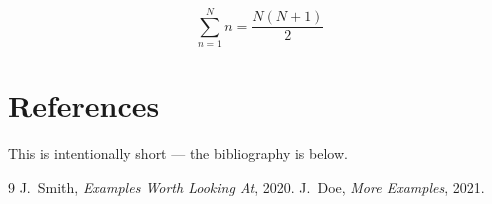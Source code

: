 \documentclass{book}
\begin{document}
\begin{equation}\label{eq:closing}
\sum_{n=1}^{N} n = \frac{N(N+1)}{2}
\end{equation}

\chapter{References}\label{ch:references}

This is intentionally short — the bibliography is below.

\begin{thebibliography}{9}
 J.~Smith, \emph{Examples Worth Looking At}, 2020.
 J.~Doe, \emph{More Examples}, 2021.
\end{thebibliography}
\end{document}
